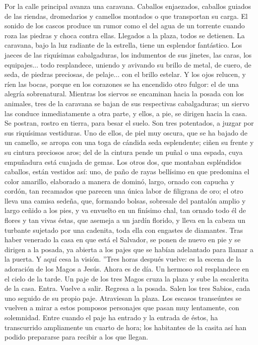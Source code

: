 \documentclass[12pt]{book} %
\begin{document}
Por la calle principal avanza una caravana. Caballos enjaezados, caballos guiados de las riendas, dromedarios y camellos montados o que transportan su carga. El sonido de los cascos produce un rumor como el del agua de un torrente cuando roza las piedras y choca contra ellas. Llegados a la plaza, todos se detienen. La caravana, bajo la luz radiante de la estrella, tiene un esplendor fantástico. Los jaeces de las riquísimas cabalgaduras, los indumentos de sus jinetes, las caras, los equipajes... todo resplandece, uniendo y avivando su brillo de metal, de cuero, de seda, de piedras preciosas, de pelaje... con el brillo estelar. Y los ojos relucen, y ríen las bocas, porque en los corazones se ha encendido otro fulgor: el de una alegría sobrenatural. 
Mientras los siervos se encaminan hacia la posada con los animales, tres de la caravana se bajan de sus respectivas 
cabalgaduras; un siervo las conduce inmediatamente a otra parte, y ellos, a pie, se dirigen hacia la casa. Se postran, rostro en tierra, para besar el suelo. Son tres potentados, a juzgar por sus riquísimas vestiduras. Uno de ellos, de piel muy oscura, que se ha bajado de un camello, se arropa con una toga de cándida seda esplendente; ciñen su frente y su cintura preciosos aros; del de la cintura pende un puñal o una espada, cuya empuñadura está cuajada de gemas. Los otros dos, que montaban espléndidos caballos, están vestidos así: uno, de paño de rayas bellísimo en que predomina el color amarillo, elaborado a manera de dominó, largo, ornado con capucha y cordón, tan recamados que parecen una única labor de filigrana de oro; el otro lleva una camisa sedeña, que, formando bolsas, sobresale del pantalón amplio y largo ceñido a los pies, y va envuelto en un finísimo chal, tan ornado todo él de flores y tan vivas éstas, que asemeja a un jardín florido, y  lleva en la cabeza un turbante sujetado por una cadenita, toda ella con engastes de diamantes. 
Tras haber venerado la casa en que está el Salvador, se ponen de nuevo en pie y se dirigen a la posada, ya abierta a los 
pajes que se habían adelantado para llamar a la puerta. 
Y aquí cesa la visión. ''Tres horas después vuelve: es la escena de la adoración de los Magos a Jesús. 
Ahora es de día. Un hermoso sol resplandece en el cielo de la tarde. Un paje de los tres Magos cruza la plaza y sube la 
escalerita de la casa. Entra. Vuelve a salir. Regresa a la posada. 
Salen los tres Sabios, cada uno seguido de su propio paje. Atraviesan la plaza. Los escasos transeúntes se vuelven a mirar a estos pomposos personajes que pasan muy lentamente, con solemnidad. Entre cuando el paje ha entrado y la entrada de éstos, ha transcurrido ampliamente un cuarto de hora; los habitantes de la casita así han podido prepararse para recibir a los que llegan. 
\end{document}

